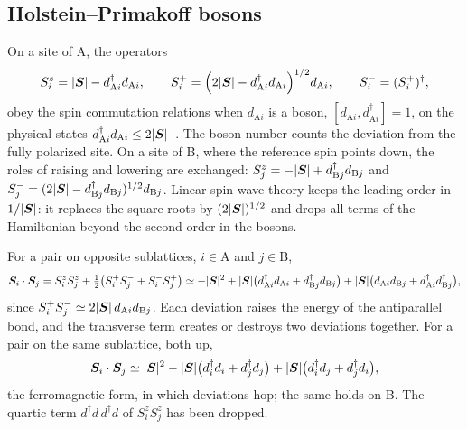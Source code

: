 \subsection*{Holstein--Primakoff bosons}

On a site of A, the operators
\begin{equation}
  S^z_i = |\bm{S}| - d^\dagger_{\mathrm{A}i}d_{\mathrm{A}i}, \qquad
  S^+_i = \Bigl(2|\bm{S}| - d^\dagger_{\mathrm{A}i}d_{\mathrm{A}i}\Bigr)^{1/2}d_{\mathrm{A}i}, \qquad
  S^-_i = (S^+_i)^\dagger ,
  \label{eq:D.19-HP}
\end{equation}
obey the spin commutation relations when $d_{\mathrm{A}i}$ is a boson, $[d_{\mathrm{A}i},d^\dagger_{\mathrm{A}i}] = 1$, on the physical states $d^\dagger_{\mathrm{A}i}d_{\mathrm{A}i} \le 2|\bm{S}|$~\cite{holstein1940field}. The boson number counts the deviation from the fully polarized site. On a site of B, where the reference spin points down, the roles of raising and lowering are exchanged: $S^z_j = -|\bm{S}| + d^\dagger_{\mathrm{B}j}d_{\mathrm{B}j}$ and $S^-_j = (2|\bm{S}| - d^\dagger_{\mathrm{B}j}d_{\mathrm{B}j})^{1/2}d_{\mathrm{B}j}$. Linear spin-wave theory keeps the leading order in $1/|\bm{S}|$: it replaces the square roots by $(2|\bm{S}|)^{1/2}$ and drops all terms of the Hamiltonian beyond the second order in the bosons.

For a pair on opposite sublattices, $i \in \mathrm{A}$ and $j \in \mathrm{B}$,
\begin{equation*}
  \bm{S}_i\cdot\bm{S}_j = S^z_iS^z_j + \tfrac12\bigl(S^+_iS^-_j + S^-_iS^+_j\bigr)
  \simeq -|\bm{S}|^2 + |\bm{S}|\bigl(d^\dagger_{\mathrm{A}i}d_{\mathrm{A}i} + d^\dagger_{\mathrm{B}j}d_{\mathrm{B}j}\bigr) + |\bm{S}|\bigl(d_{\mathrm{A}i}d_{\mathrm{B}j} + d^\dagger_{\mathrm{A}i}d^\dagger_{\mathrm{B}j}\bigr) ,
\end{equation*}
since $S^+_iS^-_j \simeq 2|\bm{S}|\,d_{\mathrm{A}i}d_{\mathrm{B}j}$. Each deviation raises the energy of the antiparallel bond, and the transverse term creates or destroys two deviations together. For a pair on the same sublattice, both up,
\begin{equation*}
  \bm{S}_i\cdot\bm{S}_j \simeq |\bm{S}|^2 - |\bm{S}|\bigl(d^\dagger_id_i + d^\dagger_jd_j\bigr) + |\bm{S}|\bigl(d^\dagger_id_j + d^\dagger_jd_i\bigr) ,
\end{equation*}
the ferromagnetic form, in which deviations hop; the same holds on B. The quartic term $d^\dagger d\,d^\dagger d$ of $S^z_iS^z_j$ has been dropped.

